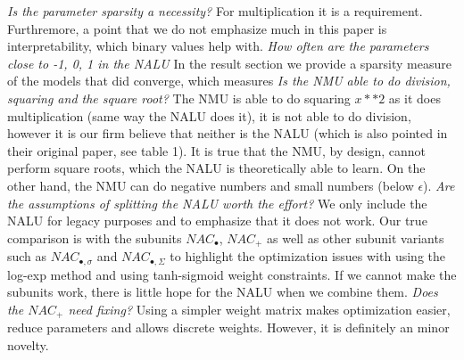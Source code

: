 \documentclass{article}
\begin{document}

\textit{Is the parameter sparsity a necessity?} For multiplication it is a requirement.
Furthremore, a point that we do not emphasize much in this paper is interpretability, which binary values help with.%
\textit{How often are the parameters close to {-1, 0, 1} in the NALU} In the result section we provide a sparsity measure of the models that did converge, which measures %
\textit{Is the NMU able to do division, squaring and the square root?} The NMU is able to do squaring $x**2$ as it does multiplication (same way the NALU does it), it is not able to do division, however it is our firm believe that neither is the NALU (which is also pointed in their original paper, see table 1).
It is true that the NMU, by design, cannot perform square roots, which the NALU is theoretically able to learn.
On the other hand, the NMU can do negative numbers and small numbers (below $\epsilon$).
\textit{Are the assumptions of splitting the NALU worth the effort?} We only include the NALU for legacy purposes and to emphasize that it does not work.
Our true comparison is with the subunits $NAC_{\bullet}$, $NAC_{+}$ as well as other subunit variants such as $NAC_{\bullet, \sigma}$ and $NAC_{\bullet, \Sigma}$ to highlight the optimization issues with using the log-exp method and using tanh-sigmoid weight constraints.
If we cannot make the subunits work, there is little hope for the NALU when we combine them.
\textit{Does the $NAC_{+}$ need fixing?} Using a simpler weight matrix makes optimization easier, reduce parameters and allows discrete weights. However, it is definitely an minor novelty.
%
\end{document}
